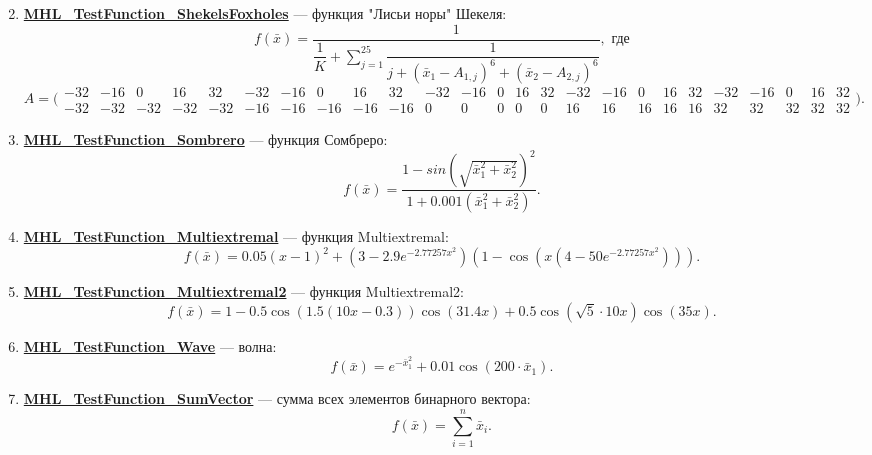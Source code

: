 \begin{enumerate}
\begin{equation}
 \end{equation}
 \item \hyperref[TestFunctions:section:MHL_TestFunction_ShekelsFoxholes]{\textbf{MHL\_TestFunction\_ShekelsFoxholes}} --- функция "Лисьи норы" Шекеля:
 \begin{equation}
 f\left( \bar{x}\right) = \dfrac{1}{\dfrac{1}{K}+\sum_{j=1}^{25}\dfrac{1}{j+\left( \bar{x}_1-A_{1,j}\right)^6+ \left( \bar{x}_2-A_{2,j}\right)^6}}, \text{ где}
 \end{equation}
 \begin{equation*}
 A =  \bigl(\begin{smallmatrix}
 -32 & -16 & 0 & 16 & 32 & -32 & -16 & 0 & 16 & 32 & -32 & -16 & 0 & 16 & 32 & -32 & -16 & 0 & 16 & 32 & -32 & -16 & 0 & 16 & 32\\
 -32 & -32 & -32 & -32 & -32 & -16 & -16 & -16 & -16 & -16 & 0 & 0 & 0 & 0 & 0 & 16 & 16 & 16 & 16 & 16 & 32 & 32 & 32 & 32 & 32
 \end{smallmatrix}\bigr).
 \end{equation*}
 \item \hyperref[TestFunctions:section:MHL_TestFunction_Sombrero]{\textbf{MHL\_TestFunction\_Sombrero}} --- функция Сомбреро:
 \begin{equation}
 f\left( \bar{x}\right) =\dfrac{1-{sin\left( \sqrt{\bar{x}_1^2+\bar{x}_2^2}\right)}^2 }{1+0.001\left(\bar{x}_1^2+\bar{x}_2^2 \right) }.
 \end{equation}
 \item \hyperref[TestFunctions:section:MHL_TestFunction_Multiextremal]{\textbf{MHL\_TestFunction\_Multiextremal}} --- функция Multiextremal:
 \begin{equation}
 f\left( \bar{x}\right) = 0.05\left( x-1\right)^2 + \left( 3-2.9e^{-2.77257x^2}\right)\left( 1-\cos\left(x\left(4-50e^{-2.77257x^2} \right)  \right) \right).
 \end{equation}
 \item \hyperref[TestFunctions:section:MHL_TestFunction_Multiextremal2]{\textbf{MHL\_TestFunction\_Multiextremal2}} --- функция Multiextremal2:
 \begin{equation}
 f\left( \bar{x}\right) =1-0.5\cos\left( 1.5\left( 10x-0.3\right) \right)\cos\left( 31.4x\right)+0.5\cos\left(\sqrt{5}\cdot10x \right)\cos\left( 35x\right). 
 \end{equation}
 \item \hyperref[TestFunctions:section:MHL_TestFunction_Wave]{\textbf{MHL\_TestFunction\_Wave}} --- волна:
 \begin{equation}
 f\left( \bar{x}\right) = e^{ -\bar{x}_1^2}+0.01\cos\left( 200\cdot\bar{x}_1\right).
 \end{equation}
 \item \hyperref[TestFunctions:section:MHL_TestFunction_SumVector]{\textbf{MHL\_TestFunction\_SumVector}} --- сумма всех элементов бинарного вектора:
 \begin{equation}
 f\left( \bar{x}\right) = \sum_{i=1}^{n}\bar{x}_i.
 \end{equation}
 \end{enumerate}